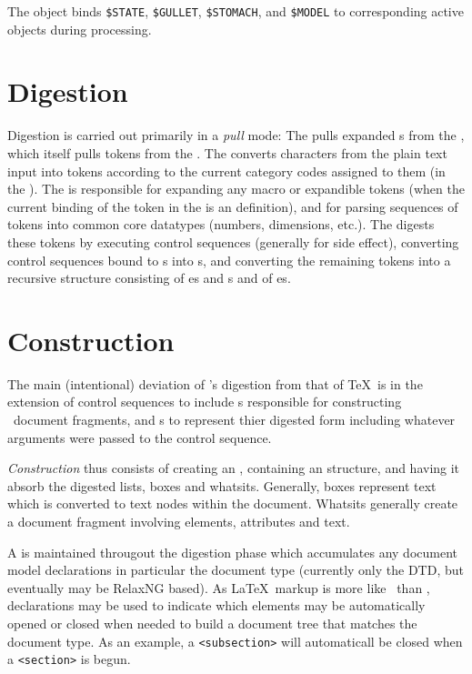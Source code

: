 \documentclass{report}
\begin{document}
The \ltxpkg{} object binds \verb|$STATE|, \verb|$GULLET|, \verb|$STOMACH|,
and \verb|$MODEL| to corresponding active objects during processing.

\section{Digestion}\label{architecture.digestion}
Digestion is carried out primarily in a \emph{pull} mode: The 
pulls expanded s from the , which itself pulls tokens from 
the .  The  converts characters from the plain text input
into tokens according to the current category codes assigned to them (in the ).  
The  is responsible for expanding any macro or expandible
tokens (when the current binding of the token in the  is 
an  definition), 
and for parsing sequences of tokens into common core datatypes (numbers, dimensions, etc.).
The  digests these tokens by executing  control 
sequences (generally for side effect), converting control sequences bound
to s into s, and converting the remaining tokens
into a recursive structure consisting of
es and s and of es.

\section{Construction}\label{architecture.construction}
The main (intentional) deviation of \LaTeXML's digestion from that of \TeX\ is in the
extension of control sequences to include s responsible for constructing
\XML\ document fragments, and s to represent thier digested form including
whatever arguments were passed to the control sequence.

\emph{Construction} thus consists of creating an , containing
an  structure, and having it absorb the digested lists, boxes
and whatsits.  Generally, boxes represent text which is converted to text nodes within the
document. Whatsits generally create a document fragment involving elements, attributes
and text.  

A  is maintained througout the digestion phase which accumulates
any document model declarations in particular the document type (currently only
the DTD, but eventually may be RelaxNG based).  As \LaTeX\ markup is more
like \SGML\ than \XML, declarations may be used to indicate which elements may
be automatically opened or closed when needed to build a document tree that matches
the document type.  As an example, a \verb|<subsection>| will automaticall be closed
when a \verb|<section>| is begun.
\end{document}
